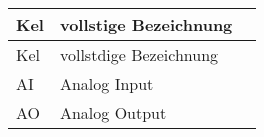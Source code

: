 \begin{longtable}{@{}l@{\qquad}X@{\quad}p{18mm}}
\toprule
Kel 	& vollstige Bezeichnung\\ \midrule
\endfirsthead
\toprule
Kel & vollstdige Bezeichnung\\ \midrule
\endhead

AI & Analog Input\\
AO & Analog Output\\


\end{longtable}
